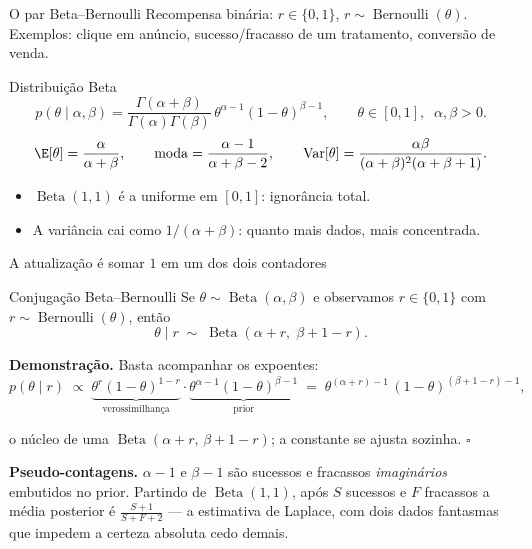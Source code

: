 \documentclass[aspectratio=169, 11pt]{beamer}
\newcommand{\Bdist}{\operatorname{Beta}}
\newcommand{\Bern}{\operatorname{Bernoulli}}
\begin{document}
\begin{frame}{O par Beta--Bernoulli}
  Recompensa binária: $r \in \{0,1\}$, $r \sim \Bern(\theta)$.
  Exemplos: clique em anúncio, sucesso/fracasso de um tratamento, conversão
  de venda.

  \begin{defbox}{Distribuição Beta}
    \[
      p(\theta \mid \alpha, \beta)
      = \frac{\Gamma(\alpha+\beta)}{\Gamma(\alpha)\Gamma(\beta)}\,
        \theta^{\alpha-1}(1-\theta)^{\beta-1},
      \qquad \theta \in [0,1],\;\; \alpha,\beta > 0.
    \]
    \[
      \E[\theta] = \frac{\alpha}{\alpha+\beta},
      \qquad
      \mathrm{moda} = \frac{\alpha-1}{\alpha+\beta-2},
      \qquad
      \mathrm{Var}[\theta] = \frac{\alpha\beta}{(\alpha+\beta)^2(\alpha+\beta+1)} .
    \]
  \end{defbox}

  \begin{itemize}
    \item $\Bdist(1,1)$ é a \alert{uniforme} em $[0,1]$: ignorância total.
    \item A variância cai como $1/(\alpha+\beta)$: quanto mais dados, mais
          concentrada.
  \end{itemize}
\end{frame}

\begin{frame}{A atualização é somar $1$ em um dos dois contadores}
  \begin{teobox}{Conjugação Beta--Bernoulli}
    Se $\theta \sim \Bdist(\alpha,\beta)$ e observamos $r \in \{0,1\}$ com
    $r \sim \Bern(\theta)$, então
    \[
      \theta \mid r \;\sim\; \Bdist(\alpha + r,\; \beta + 1 - r).
    \]
  \end{teobox}

  {\small
  \textbf{Demonstração.} Basta acompanhar os expoentes:
  \vspace{-0.4em}
  \[
    p(\theta \mid r) \;\propto\; \underbrace{\theta^{r}(1-\theta)^{1-r}}_{\text{verossimilhança}}
      \cdot \underbrace{\theta^{\alpha-1}(1-\theta)^{\beta-1}}_{\text{prior}}
    \;=\; \theta^{(\alpha + r)-1}\,(1-\theta)^{(\beta + 1 - r)-1},
  \]
  \vspace{-1.1em}

  o núcleo de uma $\Bdist(\alpha+r,\,\beta+1-r)$; a constante se ajusta
  sozinha. $\square$}

  \begin{ideiabox}
    \textbf{Pseudo-contagens.} $\alpha-1$ e $\beta-1$ são sucessos e
    fracassos \emph{imaginários} embutidos no prior. Partindo de
    $\Bdist(1,1)$, após $S$ sucessos e $F$ fracassos a média posterior é
    $\frac{S+1}{S+F+2}$ — a estimativa de Laplace, com dois dados
    fantasmas que impedem a certeza absoluta cedo demais.
  \end{ideiabox}
\end{frame}
\end{document}
